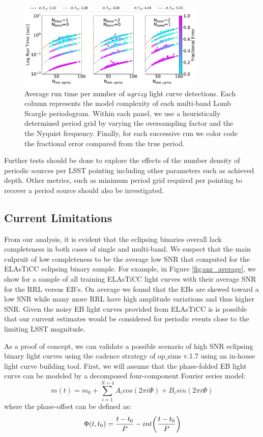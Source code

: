 \documentclass[DM,authoryear,toc]{lsstdoc}
\begin{document}
\begin{figure}
  \includegraphics[width=0.8\textwidth]{figures/multi-lsp-runs.pdf}
  \centering 
  \caption{Average run time per number of $ugrizy$ light curve detections.
Each column represents the model complexity of each multi-band Lomb Scargle periodogram.
Within each panel, we use a heuristically determined period grid by varying the oversampling factor and the the Nyquist frequency.
 Finally, for each successive run we color code the fractional error compared from the true period.}
 \label{fig:run_time_multi}
\end{figure}

Further tests should be done to explore the effects of the number density of periodic sources per LSST pointing including other parameters such as achieved depth. Other metrics, such as minimum period grid required per pointing to recover a period source should also be investigated. 


\subsection{Current Limitations}\label{sec:limitations}

From our analysis, it is evident that the eclipsing binaries overall lack completeness in both cases of single and multi-band.
We suspect that the main culpruit of low completeness to be the average low SNR that computed for the ELAsTiCC eclipsing binary sample.
For example, in Figure \ref{fig:snr_average}, we show for a sample of all training ELAsTiCC light curves with their average SNR for the RRL versus EB's.
On average we found that the EBs are skewed toward a low SNR while many more RRL have high amplitude variations and thus higher SNR.
Given the noisy EB light curves provided from ELAsTiCC is is possible that our current estimates would be considered for periodic events close to the limiting LSST magnitude.

As a proof of concept, we can validate a possible scenario of high SNR eclipsing binary light curves using the cadence strategy of op$\_$sims v.1.7 using an in-house light curve building tool.
First, we will assume that the phase-folded EB light curve can be modeled by a decomposed four-component Fourier series model:
\begin{equation}
m(t) = m_0 + \sum_{i=1}^{N=4} A_icos(2\pi i\Phi) + B_isin(2\pi i \Phi)
\end{equation}
where the phase-offset can be defined as:
\begin{equation}
\Phi(t,t_{0}) = \frac{t-t_{0}}{P}-int\bigg{(}\frac{t-t_{0}}{P} \bigg{)}
\end{equation}
\end{document}
